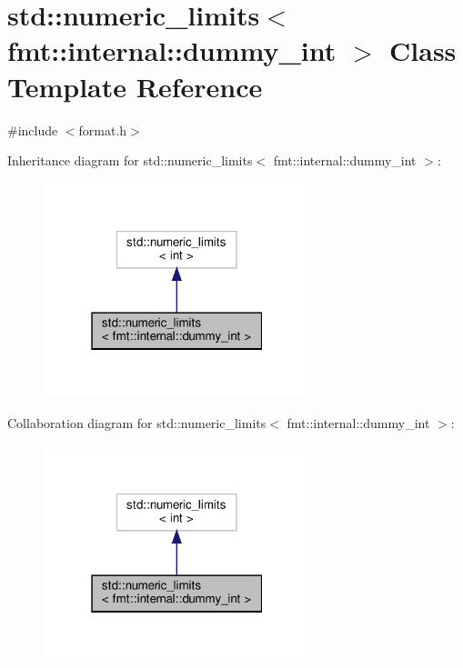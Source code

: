 \hypertarget{classstd_1_1numeric__limits_3_01fmt_1_1internal_1_1dummy__int_01_4}{}\section{std\+:\+:numeric\+\_\+limits$<$ fmt\+:\+:internal\+:\+:dummy\+\_\+int $>$ Class Template Reference}
\label{classstd_1_1numeric__limits_3_01fmt_1_1internal_1_1dummy__int_01_4}


{\ttfamily \#include $<$format.\+h$>$}



Inheritance diagram for std\+:\+:numeric\+\_\+limits$<$ fmt\+:\+:internal\+:\+:dummy\+\_\+int $>$\+:
\nopagebreak
\begin{figure}[H]
\begin{center}
\leavevmode
\includegraphics[width=220pt]{classstd_1_1numeric__limits_3_01fmt_1_1internal_1_1dummy__int_01_4__inherit__graph}
\end{center}
\end{figure}


Collaboration diagram for std\+:\+:numeric\+\_\+limits$<$ fmt\+:\+:internal\+:\+:dummy\+\_\+int $>$\+:
\nopagebreak
\begin{figure}[H]
\begin{center}
\leavevmode
\includegraphics[width=220pt]{classstd_1_1numeric__limits_3_01fmt_1_1internal_1_1dummy__int_01_4__coll__graph}
\end{center}
\end{figure}
